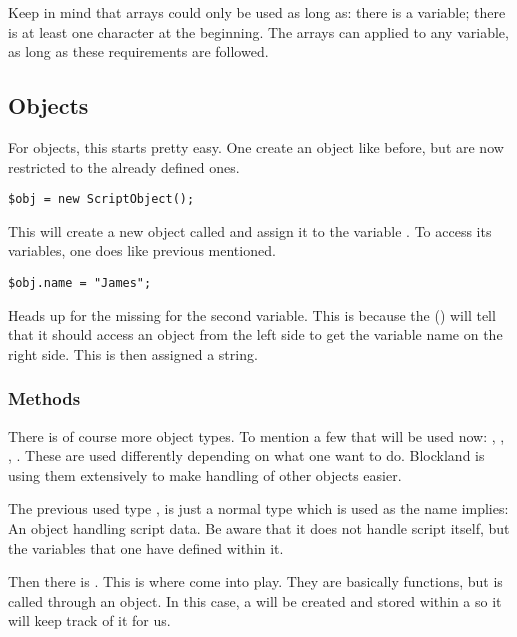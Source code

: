 Keep in mind that arrays could only be used as long as: there is a variable; there is at least one character at the beginning. The arrays can applied to any variable, as long as these requirements are followed.

\subsection{Objects}

For objects, this starts pretty easy. One create an object like before, but are now restricted to the already defined ones.

\begin{lstlisting}[style=ts]
$obj = new ScriptObject();
\end{lstlisting}

This will create a new object called  and assign it to the variable . To access its variables, one does like previous mentioned.

\begin{lstlisting}[style=ts]
$obj.name = "James";
\end{lstlisting}

Heads up for the missing \code{\$} for the second variable. This is because the  () will tell that it should access an object from the left side to get the variable name on the right side. This is then assigned a string.

\subsubsection{Methods}

There is of course more object types. To mention a few that will be used now: , , , . These are used differently depending on what one want to do. Blockland is using them extensively to make handling of other objects easier.

The previous used type , is just a normal type which is used as the name implies: An object handling script data. Be aware that it does not handle script itself, but the variables that one have defined within it.

Then there is . This is where  come into play. They are basically functions, but is called through an object. In this case, a  will be created and stored within a  so it will keep track of it for us.

